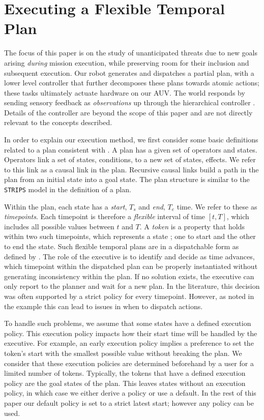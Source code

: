 \section{Executing a Flexible Temporal Plan}
\label{sec: defs}

The focus of this paper is on the study of unanticipated threats due
to new goals arising \emph{during} mission execution, while preserving
room for their inclusion and subsequent execution.  Our robot
generates and dispatches a partial plan, with a lower level controller
that further decomposes these plans towards atomic actions; these
tasks ultimately actuate hardware on our AUV. The world responds by
sending sensory feedback as \emph{observations} up through the
hierarchical controller \cite{mcgann08a,rajan12}. Details of the
controller are beyond the scope of this paper and are not directly
relevant to the concepts described.

In order to explain our execution method, we first consider some basic
definitions related to a plan consistent with \cite{Nau:2004}. A plan
has a given set of operators and states.  Operators link a set of
states, conditions, to a new set of states, effects. We refer to this
link as a causal link in the plan. Recursive causal links build a path
in the plan from an initial state into a goal state. The plan
structure is similar to the \texttt{STRIPS} model in the definition of
a plan.

Within the plan, each state has a {\em start}, $T_s$ and {\em end},
$T_e$ time. We refer to these as {\em timepoints}. Each timepoint is
therefore a \emph{flexible} interval of time $[t, T]$, which includes
all possible values between $t$ and $T$.  A \emph{token} is a property
that holds within two such timepoints, which represents a state
\cite{py10}; one to start and the other to end the state.  Such
flexible temporal plans are in a dispatchable form as defined by
\cite{mus98a}.  The role of the executive is to identify and decide as
time advances, which timepoint within the dispatched plan can be
properly instantiated without generating inconsistency within the
plan. If no solution exists, the executive can only report to the
planner and wait for a new plan. In the literature, this decision was
often supported by a strict policy for every timepoint. However, as
noted in the example this can lead to issues in when to dispatch
actions.

To handle such problems, we assume that some states have a defined
execution policy. This execution policy impacts how their start time
will be handled by the executive. For example, an early execution
policy implies a preference to set the token's start with the smallest
possible value without breaking the plan. We consider that these
execution policies are determined beforehand by a user for a limited
number of tokens. Typically, the tokens that have a defined execution
policy are the goal states of the plan. This leaves states without an
execution policy, in which case we either derive a policy or use a
default. In the rest of this paper our default policy is set to a
strict latest start; however any policy can be used.


